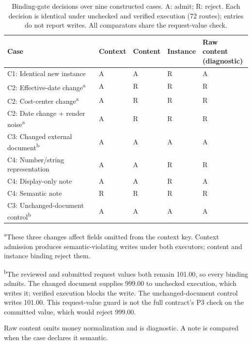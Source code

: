 \documentclass[pdflatex,sn-basic]{sn-jnl}
\begin{document}
\begin{table}[tbp]
\caption{Binding-gate decisions over nine constructed cases. A: admit; R: reject. Each decision is identical under unchecked and verified execution (72 routes); entries do not report writes. All comparators share the request-value check.}\label{tab:binding-scope}
\centering\footnotesize
\setlength{\tabcolsep}{3pt}
\renewcommand{\arraystretch}{1.12}
\begin{tabularx}{\textwidth}{@{}>{\raggedright\arraybackslash}p{}*{4}{>{\centering\arraybackslash}X}@{}}
\toprule
Case & Context & Content & Instance & \shortstack{Raw content\\(diagnostic)} \\
\midrule
C1: Identical new instance & A & A & R & A \\
C2: Effective-date change\textsuperscript{a} & A & R & R & R \\
C2: Cost-center change\textsuperscript{a} & A & R & R & R \\
C2: Date change + render noise\textsuperscript{a} & A & R & R & R \\
C3: Changed external document\textsuperscript{b} & A & A & A & A \\
C4: Number/string representation & A & A & R & R \\
C4: Display-only note & A & A & R & A \\
C4: Semantic note & R & R & R & R \\
C3: Unchanged-document control\textsuperscript{b} & A & A & A & A \\

\bottomrule
\end{tabularx}
\par\smallskip
\begin{minipage}{\textwidth}\footnotesize\raggedright
\textsuperscript{a}These three changes affect fields omitted from the context key. Context admission produces semantic-violating writes under both executors; content and instance binding reject them.\par
\textsuperscript{b}The reviewed and submitted request values both remain 101.00, so every binding admits. The changed document supplies 999.00 to unchecked execution, which writes it; verified execution blocks the write. The unchanged-document control writes 101.00. This request-value guard is not the full contract's P3 check on the committed value, which would reject 999.00.\par
Raw content omits money normalization and is diagnostic. A note is compared when the case declares it semantic.
\end{minipage}
\end{table}
\end{document}
